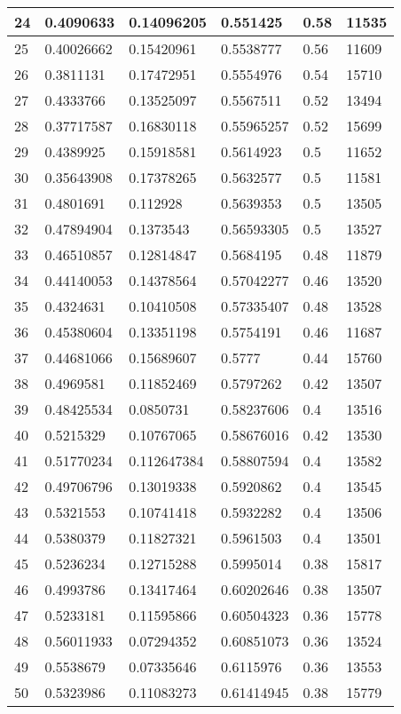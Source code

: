 \begin{longtable}{|l|l|l|l|l|l|}
24 & 0.4090633 & 0.14096205 & 0.551425 & 0.58 & 11535 \\ \hline 
25 & 0.40026662 & 0.15420961 & 0.5538777 & 0.56 & 11609 \\ \hline 
26 & 0.3811131 & 0.17472951 & 0.5554976 & 0.54 & 15710 \\ \hline 
27 & 0.4333766 & 0.13525097 & 0.5567511 & 0.52 & 13494 \\ \hline 
28 & 0.37717587 & 0.16830118 & 0.55965257 & 0.52 & 15699 \\ \hline 
29 & 0.4389925 & 0.15918581 & 0.5614923 & 0.5 & 11652 \\ \hline 
30 & 0.35643908 & 0.17378265 & 0.5632577 & 0.5 & 11581 \\ \hline 
31 & 0.4801691 & 0.112928 & 0.5639353 & 0.5 & 13505 \\ \hline 
32 & 0.47894904 & 0.1373543 & 0.56593305 & 0.5 & 13527 \\ \hline 
33 & 0.46510857 & 0.12814847 & 0.5684195 & 0.48 & 11879 \\ \hline 
34 & 0.44140053 & 0.14378564 & 0.57042277 & 0.46 & 13520 \\ \hline 
35 & 0.4324631 & 0.10410508 & 0.57335407 & 0.48 & 13528 \\ \hline 
36 & 0.45380604 & 0.13351198 & 0.5754191 & 0.46 & 11687 \\ \hline 
37 & 0.44681066 & 0.15689607 & 0.5777 & 0.44 & 15760 \\ \hline 
38 & 0.4969581 & 0.11852469 & 0.5797262 & 0.42 & 13507 \\ \hline 
39 & 0.48425534 & 0.0850731 & 0.58237606 & 0.4 & 13516 \\ \hline 
40 & 0.5215329 & 0.10767065 & 0.58676016 & 0.42 & 13530 \\ \hline 
41 & 0.51770234 & 0.112647384 & 0.58807594 & 0.4 & 13582 \\ \hline 
42 & 0.49706796 & 0.13019338 & 0.5920862 & 0.4 & 13545 \\ \hline 
43 & 0.5321553 & 0.10741418 & 0.5932282 & 0.4 & 13506 \\ \hline 
44 & 0.5380379 & 0.11827321 & 0.5961503 & 0.4 & 13501 \\ \hline 
45 & 0.5236234 & 0.12715288 & 0.5995014 & 0.38 & 15817 \\ \hline 
46 & 0.4993786 & 0.13417464 & 0.60202646 & 0.38 & 13507 \\ \hline 
47 & 0.5233181 & 0.11595866 & 0.60504323 & 0.36 & 15778 \\ \hline 
48 & 0.56011933 & 0.07294352 & 0.60851073 & 0.36 & 13524 \\ \hline 
49 & 0.5538679 & 0.07335646 & 0.6115976 & 0.36 & 13553 \\ \hline 
50 & 0.5323986 & 0.11083273 & 0.61414945 & 0.38 & 15779 \\ \hline 
\end{longtable}